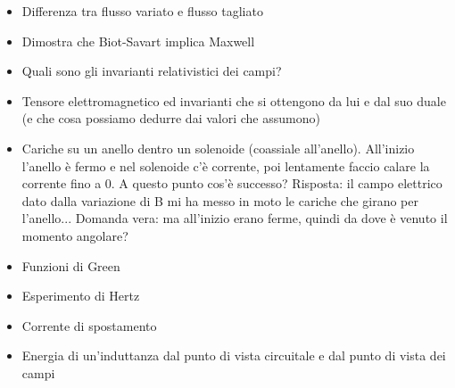 \documentclass[a4paper,NoNotes,GeneralMath]{stdmdoc}
\begin{document}
\begin{itemize}
		\item Differenza tra flusso variato e flusso tagliato
		\item Dimostra che Biot-Savart implica Maxwell
		\item Quali sono gli invarianti relativistici dei campi?
		\item Tensore elettromagnetico ed invarianti che si ottengono da lui e dal suo duale (e che cosa possiamo dedurre dai valori che assumono)
		\item Cariche su un anello dentro un solenoide (coassiale all'anello). All'inizio l'anello è fermo e nel solenoide c'è corrente, poi lentamente faccio calare la corrente fino a 0. A questo punto cos'è successo? Risposta: il campo elettrico dato dalla variazione di B mi ha messo in moto le cariche che girano per l'anello... Domanda vera: ma all'inizio erano ferme, quindi da dove è venuto il momento angolare?
		\item Funzioni di Green
		\item Esperimento di Hertz
		\item Corrente di spostamento
		\item Energia di un'induttanza dal punto di vista circuitale e dal punto di vista dei campi
	\end{itemize}
\end{document}
